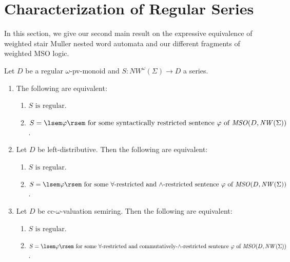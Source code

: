 \documentclass[runningheads, envcountsame, a4paper]{llncs}
\begin{document}
\section{Characterization of Regular Series} \label{chapchar}
In this section, we give our second main result on the expressive equivalence of weighted stair Muller nested word automata and our different fragments of weighted MSO logic. 
\begin{Theorem}
\label{main}
	Let $D$ be a regular $\omega$-pv-monoid and $S: \mathit{NW^\omega}(\Sigma)\rightarrow D$ a series.
	\begin{enumerate}\item 	The following are equivalent:
		\begin{enumerate}\item $S \text{ is regular}$.
			\item $S=\lsem \varphi \rsem \text{ for some syntactically restricted sentence }\varphi \text{ of } \\ \mathit{MSO}(D, \mathit{NW}(\Sigma))$.
		\end{enumerate}
	\item 	Let $D$ be left-distributive. Then the following are equivalent:
		\begin{enumerate}\item $S \text{ is regular}$.
			\item $S=\lsem \varphi \rsem \text{ for some $\forall$-restricted and } \text{$\wedge$-restricted sentence } \varphi \text{ of } \\ \mathit{MSO}(D, \mathit{NW}(\Sigma))$.
		\end{enumerate}
	\item 	Let $D$ be cc-$\omega$-valuation semiring. Then the following are equivalent:
		\begin{enumerate}\item $S \text{ is regular}$.
			\item $S=\lsem \varphi \rsem \text{ for some $\forall$-restricted and } \text{commutatively-$\wedge$-restricted sentence } \\ \varphi \text{ of } \mathit{MSO}(D, \mathit{NW}(\Sigma))$.
		\end{enumerate}
	\end{enumerate}
\end{Theorem}
\end{document}
